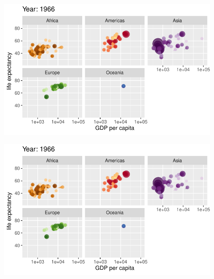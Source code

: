 \documentclass[
  letterpaper,
  DIV=11,
  numbers=noendperiod]{scrartcl}
\begin{document}
\begin{figure}[H]

{\centering \includegraphics{class05_files/figure-pdf/unnamed-chunk-24-26.pdf}

}

\end{figure}

\begin{figure}[H]

{\centering \includegraphics{class05_files/figure-pdf/unnamed-chunk-24-27.pdf}

}

\end{figure}
\end{document}
